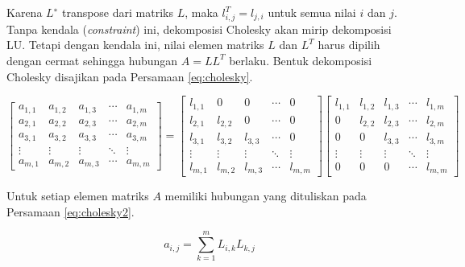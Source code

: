 \documentclass[
]{book}
\theoremstyle{definition}
\theoremstyle{definition}
\theoremstyle{definition}
\theoremstyle{definition}
\theoremstyle{remark}
\begin{document}
Karena \(L^∗\) transpose dari matriks \(L\), maka \(l^{T}_{i,j} = l_{j,i}\) untuk semua nilai \(i\) dan \(j\). Tanpa kendala (\emph{constraint}) ini, dekomposisi Cholesky akan mirip dekomposisi LU. Tetapi dengan kendala ini, nilai elemen matriks \(L\) dan \(L^T\) harus dipilih dengan cermat sehingga hubungan \(A = LL^T\) berlaku. Bentuk dekomposisi Cholesky disajikan pada Persamaan \eqref{eq:cholesky}.

\begin{equation}
\begin{bmatrix}
     a_{1,1} & a_{1,2} & a_{1,3} &\cdots& a_{1,m}           \\[0.3em]
     a_{2,1} & a_{2,2} & a_{2,3} &\cdots& a_{2,m}           \\[0.3em]
     a_{3,1} & a_{3,2} & a_{3,3} &\cdots& a_{3,m}           \\[0.3em]
     \vdots  & \vdots  & \vdots  &\ddots& \vdots            \\[0.3em]
     a_{m,1} & a_{m,2} & a_{m,3} &\cdots& a_{m,m}
     \end{bmatrix}
=
\begin{bmatrix}
     l_{1,1} & 0       & 0       &\cdots& 0           \\[0.3em]
     l_{2,1} & l_{2,2} & 0       &\cdots& 0           \\[0.3em]
     l_{3,1} & l_{3,2} & l_{3,3} &\cdots& 0           \\[0.3em]
     \vdots  & \vdots  & \vdots  &\ddots& \vdots            \\[0.3em]
     l_{m,1} & l_{m,2} & l_{m,3} &\cdots& l_{m,m}
     \end{bmatrix}
\begin{bmatrix}
     l_{1,1} & l_{1,2} & l_{1,3} &\cdots& l_{1,m}           \\[0.3em]
     0       & l_{2,2} & l_{2,3} &\cdots& l_{2,m}           \\[0.3em]
     0       & 0       & l_{3,3} &\cdots& l_{3,m}           \\[0.3em]
     \vdots  & \vdots  & \vdots  &\ddots& \vdots            \\[0.3em]
     0       & 0       & 0       &\cdots& l_{m,m}
     \end{bmatrix}
  \label{eq:cholesky}
\end{equation}

Untuk setiap elemen matriks \(A\) memiliki hubungan yang dituliskan pada Persamaan \eqref{eq:cholesky2}.

\begin{equation}
a_{i,j}=\sum_{k=1}^mL_{i,k}L_{k,j}
  \label{eq:cholesky2}
\end{equation}
\end{document}
